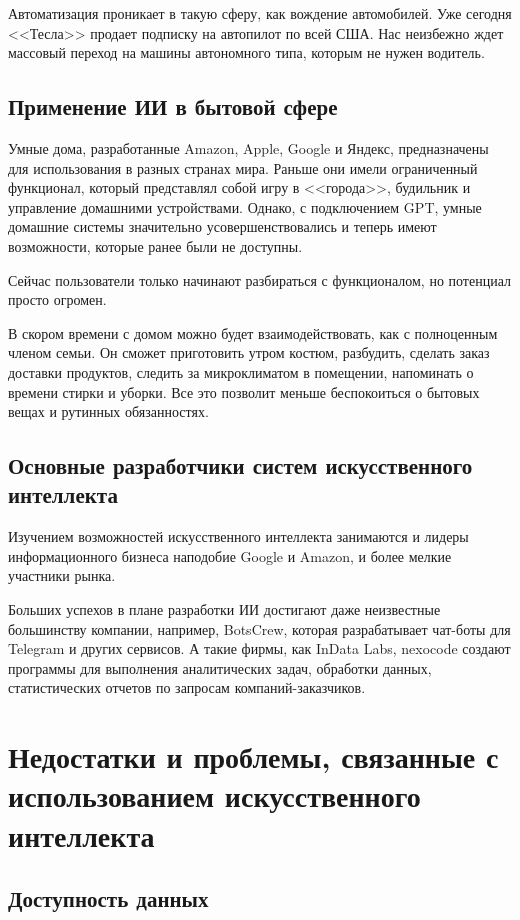 \documentclass[bachelor,och,referat]{SCWorks_corrected}
\begin{document}
Автоматизация проникает в такую сферу, как вождение автомобилей. Уже сегодня <<Тесла>> продает подписку на автопилот по всей США. Нас неизбежно ждет массовый переход на машины автономного типа, которым не нужен водитель.

\subsection{Применение ИИ в бытовой сфере}
    
Умные дома, разработанные Amazon, Apple, Google и Яндекс, предназначены для использования в разных странах мира. Раньше они имели ограниченный функционал, который представлял собой игру в <<города>>, будильник и управление домашними устройствами. Однако, с подключением GPT, умные домашние системы значительно усовершенствовались и теперь имеют возможности, которые ранее были не доступны.

Сейчас пользователи только начинают разбираться с функционалом, но потенциал просто огромен.

В скором времени с домом можно будет взаимодействовать, как с полноценным членом семьи. Он сможет приготовить утром костюм, разбудить, сделать заказ доставки продуктов, следить за микроклиматом в помещении, напоминать о времени стирки и уборки. Все это позволит меньше беспокоиться о бытовых вещах и рутинных обязанностях.

\subsection{Основные разработчики систем искусственного интеллекта}
   
Изучением возможностей искусственного интеллекта занимаются и лидеры информационного бизнеса наподобие Google и Amazon, и более мелкие участники рынка.

Больших успехов в плане разработки ИИ достигают даже неизвестные большинству компании, например, BotsCrew, которая разрабатывает чат-боты для Telegram и других сервисов. А такие фирмы, как InData Labs, nexocode создают программы для выполнения аналитических задач, обработки данных, статистических отчетов по запросам компаний-заказчиков.

\section{Недостатки и проблемы, связанные с использованием искусственного интеллекта}

\subsection{Доступность данных}
    
\end{document}
